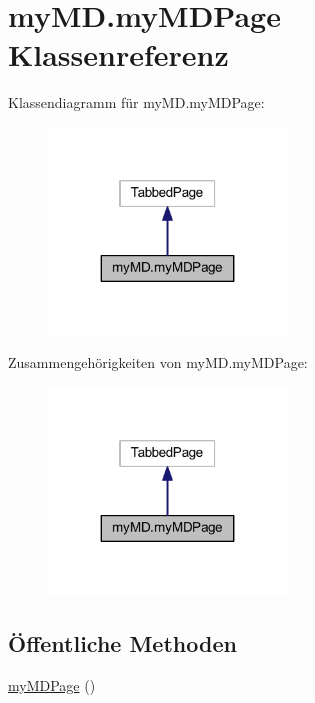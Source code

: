 \hypertarget{classmy_m_d_1_1my_m_d_page}{}\section{my\+M\+D.\+my\+M\+D\+Page Klassenreferenz}
\label{classmy_m_d_1_1my_m_d_page}


Klassendiagramm für my\+M\+D.\+my\+M\+D\+Page\+:
\nopagebreak
\begin{figure}[H]
\begin{center}
\leavevmode
\includegraphics[width=179pt]{classmy_m_d_1_1my_m_d_page__inherit__graph}
\end{center}
\end{figure}


Zusammengehörigkeiten von my\+M\+D.\+my\+M\+D\+Page\+:
\nopagebreak
\begin{figure}[H]
\begin{center}
\leavevmode
\includegraphics[width=179pt]{classmy_m_d_1_1my_m_d_page__coll__graph}
\end{center}
\end{figure}
\subsection*{Öffentliche Methoden}
\begin{DoxyCompactItemize}
\item 
\mbox{\hyperlink{classmy_m_d_1_1my_m_d_page_a116c2084cfab3cc170d6f0c0d32e92c7}{my\+M\+D\+Page}} ()
\end{DoxyCompactItemize}


